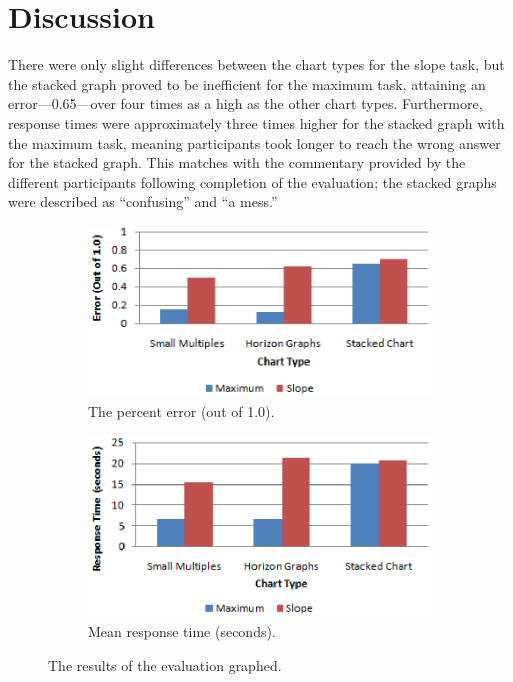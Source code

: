 \documentclass{article}
\begin{document}
\section{Discussion}

There were only slight differences between the chart types for the slope task, but the stacked graph proved to be inefficient for the maximum task, attaining an error---0.65---over four times as a high as the other chart types.  Furthermore, response times were approximately three times higher for the stacked graph with the maximum task, meaning participants took longer to reach the wrong answer for the stacked graph.  This matches with the commentary provided by the different participants following completion of the evaluation; the stacked graphs were described as ``confusing'' and ``a mess.''

\begin{figure}
	\begin{subfigure}[b]{0.49\textwidth}
		\includegraphics[width=\textwidth]{figures/results-error.eps}
		\caption{The percent error (out of 1.0).}
		\label{fig:resultsError}
        \end{subfigure}
	\begin{subfigure}[b]{0.49\textwidth}
		\includegraphics[width=\textwidth]{figures/results-time.eps}
		\caption{Mean response time (seconds).}
		\label{fig:resultsTime}
        \end{subfigure}
	\caption{The results of the evaluation graphed.}
	\label{fig:results}
\end{figure}
\end{document}
